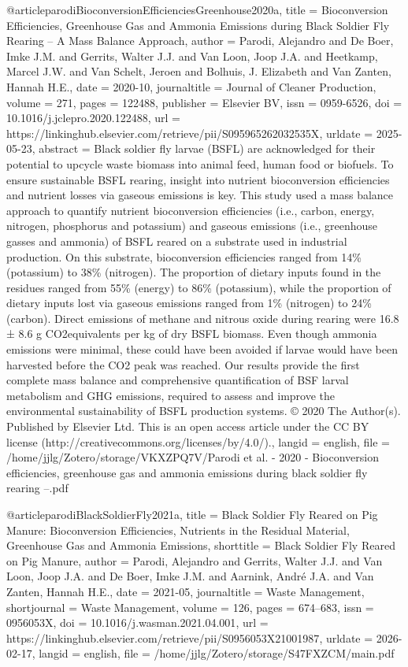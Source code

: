 {{{{@article{parodiBioconversionEfficienciesGreenhouse2020a,
  title = {Bioconversion Efficiencies, Greenhouse Gas and Ammonia Emissions during Black Soldier Fly Rearing – {{A}} Mass Balance Approach},
  author = {Parodi, Alejandro and De Boer, Imke J.M. and Gerrits, Walter J.J. and Van Loon, Joop J.A. and Heetkamp, Marcel J.W. and Van Schelt, Jeroen and Bolhuis, J. Elizabeth and Van Zanten, Hannah H.E.},
  date = {2020-10},
  journaltitle = {Journal of Cleaner Production},
  volume = {271},
  pages = {122488},
  publisher = {Elsevier BV},
  issn = {0959-6526},
  doi = {10.1016/j.jclepro.2020.122488},
  url = {https://linkinghub.elsevier.com/retrieve/pii/S095965262032535X},
  urldate = {2025-05-23},
  abstract = {Black soldier fly larvae (BSFL) are acknowledged for their potential to upcycle waste biomass into animal feed, human food or biofuels. To ensure sustainable BSFL rearing, insight into nutrient bioconversion efficiencies and nutrient losses via gaseous emissions is key. This study used a mass balance approach to quantify nutrient bioconversion efficiencies (i.e., carbon, energy, nitrogen, phosphorus and potassium) and gaseous emissions (i.e., greenhouse gasses and ammonia) of BSFL reared on a substrate used in industrial production. On this substrate, bioconversion efficiencies ranged from 14\% (potassium) to 38\% (nitrogen). The proportion of dietary inputs found in the residues ranged from 55\% (energy) to 86\% (potassium), while the proportion of dietary inputs lost via gaseous emissions ranged from 1\% (nitrogen) to 24\% (carbon). Direct emissions of methane and nitrous oxide during rearing were 16.8 ± 8.6 g CO2equivalents per kg of dry BSFL biomass. Even though ammonia emissions were minimal, these could have been avoided if larvae would have been harvested before the CO2 peak was reached. Our results provide the first complete mass balance and comprehensive quantification of BSF larval metabolism and GHG emissions, required to assess and improve the environmental sustainability of BSFL production systems. © 2020 The Author(s). Published by Elsevier Ltd. This is an open access article under the CC BY license (http://creativecommons.org/licenses/by/4.0/).},
  langid = {english},
  file = {/home/jjlg/Zotero/storage/VKXZPQ7V/Parodi et al. - 2020 - Bioconversion efficiencies, greenhouse gas and ammonia emissions during black soldier fly rearing –.pdf}
}

@article{parodiBlackSoldierFly2021a,
  title = {Black Soldier Fly Reared on Pig Manure: {{Bioconversion}} Efficiencies, Nutrients in the Residual Material, Greenhouse Gas and Ammonia Emissions},
  shorttitle = {Black Soldier Fly Reared on Pig Manure},
  author = {Parodi, Alejandro and Gerrits, Walter J.J. and Van Loon, Joop J.A. and De Boer, Imke J.M. and Aarnink, André J.A. and Van Zanten, Hannah H.E.},
  date = {2021-05},
  journaltitle = {Waste Management},
  shortjournal = {Waste Management},
  volume = {126},
  pages = {674--683},
  issn = {0956053X},
  doi = {10.1016/j.wasman.2021.04.001},
  url = {https://linkinghub.elsevier.com/retrieve/pii/S0956053X21001987},
  urldate = {2026-02-17},
  langid = {english},
  file = {/home/jjlg/Zotero/storage/S47FXZCM/main.pdf}
}

}}}}
